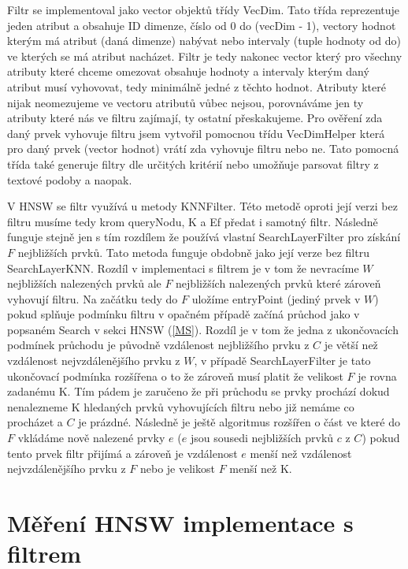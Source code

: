 \documentclass[czech,semestral,dept460,male,csharp,cpdeclaration]{diploma}
\begin{document}
		Filtr se implementoval jako vector objektů třídy VecDim. Tato třída reprezentuje jeden atribut a obsahuje ID dimenze, číslo od 0 do (vecDim - 1), vectory hodnot kterým má atribut (daná dimenze) nabývat nebo intervaly (tuple hodnoty od do) ve kterých se má atribut nacházet. Filtr je tedy nakonec vector který pro všechny atributy které chceme omezovat obsahuje hodnoty a intervaly kterým daný atribut musí vyhovovat, tedy minimálně jedné z těchto hodnot. Atributy které nijak neomezujeme ve vectoru atributů vůbec nejsou, porovnáváme jen ty atributy které nás ve filtru zajímají, ty ostatní přeskakujeme. Pro ověření zda daný prvek vyhovuje filtru jsem vytvořil pomocnou třídu VecDimHelper která pro daný prvek (vector hodnot) vrátí zda vyhovuje filtru nebo ne. Tato pomocná třída také generuje filtry dle určitých kritérií nebo umožňuje parsovat filtry z textové podoby a naopak.
		
		V HNSW se filtr využívá u metody KNNFilter. Této metodě oproti její verzi bez filtru musíme tedy krom queryNodu, K a Ef předat i samotný filtr. Následně funguje stejně jen s tím rozdílem že používá vlastní SearchLayerFilter pro získání $F$ nejbližších prvků. Tato metoda funguje obdobně jako její verze bez filtru SearchLayerKNN. Rozdíl v implementaci s filtrem je v tom že nevracíme $W$ nejbližších nalezených prvků ale $F$ nejbližších nalezených prvků které zároveň vyhovují filtru. Na začátku tedy do $F$ uložíme entryPoint (jediný prvek v $W$) pokud splňuje podmínku filtru v opačném případě začíná průchod jako v popsaném Search v sekci HNSW (\ref{MS}). Rozdíl je v tom že jedna z ukončovacích podmínek průchodu je původně vzdálenost nejbližšího prvku z $C$ je větší než vzdálenost nejvzdálenějšího prvku z $W$, v případě SearchLayerFilter je tato ukončovací podmínka rozšířena o to že zároveň musí platit že velikost $F$ je rovna zadanému K. Tím pádem je zaručeno že při průchodu se prvky prochází dokud nenalezneme K hledaných prvků vyhovujících filtru nebo již nemáme co procházet a $C$ je prázdné. Následně je ještě algoritmus rozšířen o část ve které do $F$ vkládáme nově nalezené prvky $e$ ($e$ jsou sousedi nejbližších prvků $c$ z $C$) pokud tento prvek filtr přijímá a zároveň je vzdálenost $e$ menší než vzdálenost nejvzdálenějšího prvku z $F$ nebo je velikost $F$ menší než K.
		
		\section{Měření HNSW implementace s filtrem}
		
\end{document}
